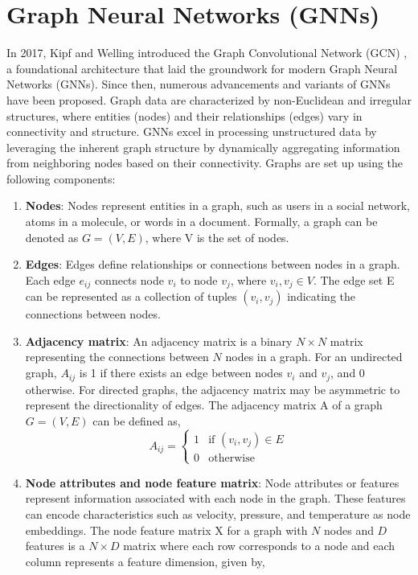 \section{Graph Neural Networks (GNNs)} \label{gnnse}
In 2017, Kipf and Welling introduced the Graph Convolutional Network (GCN) \cite{kipf}, a foundational architecture that laid the groundwork for modern Graph Neural Networks (GNNs). Since then, numerous advancements and variants of GNNs have been proposed. Graph data are characterized by non-Euclidean and irregular structures, where entities (nodes) and their relationships (edges) vary in connectivity and structure. GNNs excel in processing unstructured data by leveraging the inherent graph structure by dynamically aggregating information from neighboring nodes based on their connectivity. Graphs are set up using the following components:
\begin{enumerate}
  \item \textbf{Nodes}: Nodes represent entities in a graph, such as users in a social network, atoms in a molecule, or words in a document. Formally, a graph can be denoted as \( G = (V, E) \), where \gls{V} is the set of nodes.
  \item \textbf{Edges}: Edges define relationships or connections between nodes in a graph. Each edge \( e_{ij} \) connects node \( v_i \) to node \( v_j \), where \( v_i, v_j \in V \). The edge set \gls{E} can be represented as a collection of tuples \( (v_i, v_j) \) indicating the connections between nodes.
  \item \textbf{Adjacency matrix}: An adjacency matrix is a binary $N \times N$ matrix representing the connections between $N$ nodes in a graph. For an undirected graph, \( A_{ij} \) is 1 if there exists an edge between nodes \( v_i \) and \( v_j \), and 0 otherwise. For directed graphs, the adjacency matrix may be asymmetric to represent the directionality of edges. The adjacency matrix \gls{A} of a graph \( G = (V, E) \) can be defined as,
  \[
  A_{ij} = \begin{cases} 1 & \text{if } (v_i, v_j) \in E \\ 0 & \text{otherwise} \end{cases}
  \]
  \item \textbf{Node attributes and node feature matrix}: Node attributes or features represent information associated with each node in the graph. These features can encode characteristics such as velocity, pressure, and temperature as node embeddings. The node feature matrix \gls{X} for a graph with \( N \) nodes and \( D \) features is a $N \times D$ matrix where each row corresponds to a node and each column represents a feature dimension, given by,

\end{enumerate}
